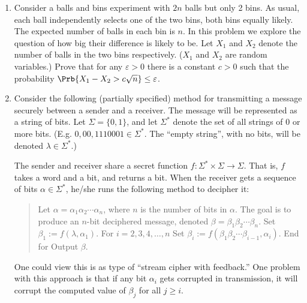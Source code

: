 \documentclass[12pt]{article}
\begin{document}
\begin{enumerate}
{}


\item
Consider a balls and bins experiment with $2n$ balls but only 2 bins.
As usual, each ball independently selects one of the two bins, both bins
equally likely. The expected
number of balls in each bin is $n$. In this problem we explore the question
of how big their difference is likely to be.
Let $X_1$ and $X_2$ denote the
number of balls in the two bins respectively. ($X_1$ and $X_2$ are random
variables.) Prove that for any $\varepsilon>0$ there is a constant
$c>0$ such that the  probability
$\Prb{X_1-X_2 > c \sqrt{n}} \le \varepsilon$.



\item 

\renewcommand\^[1]{^{\langle#1\rangle}}

Consider the following (partially specified) method
for transmitting a message securely between a sender and a receiver.
The message will be represented as a string of bits.
Let $\Sigma = \{0,1\}$, and let $\Sigma^*$ denote the
set of all strings of $0$ or more bits.
(E.g. $0, 00, 1110001 \in \Sigma^*$.
The ``empty string'', with no bits, will be denoted $\lambda \in \Sigma^*.$)

The sender and receiver share a secret function
$f: \Sigma^* \times \Sigma \rightarrow \Sigma$.
That is, $f$ takes a word and a bit, and returns a bit.
When the receiver gets a sequence of bits
$\alpha \in \Sigma^*$, he/she runs the following
method to decipher it:
\begin{quote}
\begin{code}
Let $\alpha = \alpha_1 \alpha_2 \cdots \alpha_n$, where $n$ is the number of bits in $\alpha$.
The goal is to produce an $n$-bit deciphered message, denoted $\beta = \beta_1 \beta_2 \cdots \beta_n$.
Set $\beta_1 := f(\lambda, \alpha_1).$
For $i = 2, 3, 4, \ldots, n$
  Set $\beta_i := f(\beta_1 \beta_2 \cdots \beta_{i-1}, \alpha_i)$.
  End for
Output $\beta$.
\end{code}
\end{quote}
One could view this is as type of ``stream cipher with feedback.''
One problem with this approach is that if any bit $\alpha_i$
gets corrupted in transmission, it will corrupt the computed
value of $\beta_j$ for all $j \geq i$.


\end{enumerate}
\end{document}
